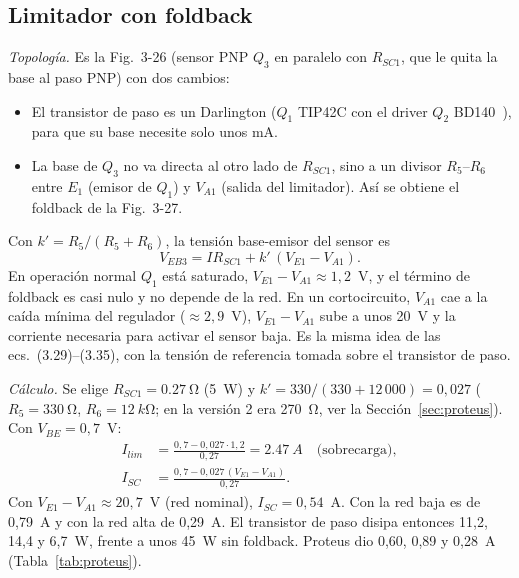 \documentclass[conference]{IEEEtran}
\begin{document}
\subsection{Limitador con foldback}
\label{sec:fb}
\textit{Topología.} Es la Fig.~3-26 (sensor PNP $Q_3$ en paralelo con $R_{SC1}$, que le quita la base al paso PNP) con dos cambios:
\begin{itemize}
\item El transistor de paso es un Darlington ($Q_1$ TIP42C con el driver $Q_2$ BD140~\cite{bd13x}), para que su base necesite solo unos mA.
\item La base de $Q_3$ no va directa al otro lado de $R_{SC1}$, sino a un divisor $R_5$--$R_6$ entre $E_1$ (emisor de $Q_1$) y $V_{A1}$ (salida del limitador). Así se obtiene el foldback de la Fig.~3-27.
\end{itemize}
Con $k'=R_5/(R_5+R_6)$, la tensión base-emisor del sensor es
\begin{equation}
V_{EB3}=I R_{SC1}+k'\,(V_{E1}-V_{A1}).
\label{eq:veb3}
\end{equation}
En operación normal $Q_1$ está saturado, $V_{E1}-V_{A1}\approx1{,}2$~V, y el término de foldback es casi nulo y no depende de la red. En un cortocircuito, $V_{A1}$ cae a la caída mínima del regulador ($\approx2{,}9$~V), $V_{E1}-V_{A1}$ sube a unos 20~V y la corriente necesaria para activar el sensor baja. Es la misma idea de las ecs.~(3.29)--(3.35), con la tensión de referencia tomada sobre el transistor de paso.

\textit{Cálculo.} Se elige $R_{SC1}=\SI{0,27}{\ohm}$ (5~W) y $k'=330/(330+12\,000)=0{,}027$ ($R_5=\SI{330}{\ohm}$, $R_6=\SI{12}{k\ohm}$; en la versión 2 era \SI{270}{\ohm}, ver la Sección~\ref{sec:proteus}). Con $V_{BE}=0{,}7$~V:
\begin{align}
I_{lim}&=\frac{0{,}7-0{,}027\cdot1{,}2}{0{,}27}=\SI{2,47}{A}\quad\text{(sobrecarga)},\\
I_{SC}&=\frac{0{,}7-0{,}027\,(V_{E1}-V_{A1})}{0{,}27}.
\end{align}
Con $V_{E1}-V_{A1}\approx20{,}7$~V (red nominal), $I_{SC}=0{,}54$~A. Con la red baja es de 0,79~A y con la red alta de 0,29~A. El transistor de paso disipa entonces 11,2, 14,4 y 6,7~W, frente a unos 45~W sin foldback. Proteus dio 0,60, 0,89 y 0,28~A (Tabla~\ref{tab:proteus}).
\end{document}
